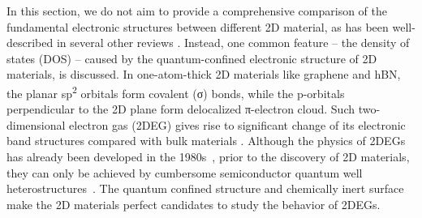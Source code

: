 %
In this section, we do not aim to provide a comprehensive comparison
of the fundamental electronic structures between different 2D
material, as has been well-described in several other reviews
\autocite{Neto_2009_Electron_gr_rev,Mas_Ballest_2011_review,Das_Sarma_2011_electron_gr,Butler_2013_review,Bhimanapati_2015_2D_rev,Novoselov_2016_vdW}.
%
Instead, one common feature -- the density of states (DOS) -- caused
by the quantum-confined electronic structure of 2D materials, is
discussed.
%
In
one-atom-thick 2D materials like graphene and hBN, the planar
sp\textsuperscript{2} orbitals form covalent (σ) bonds, while the
p-orbitals perpendicular to the 2D plane form delocalized π-electron
cloud\autocite{Ihn_2009_book}.
%
Such two-dimensional
electron gas (2DEG) gives rise to significant change of its electronic
band structures compared with bulk materials \autocite{Davies_1997_book}.
%
Although the physics of 2DEGs has already been developed in the
1980s~\autocite{Ando_1982_electron_2D}, prior to the discovery of 2D
materials, they can only be achieved by cumbersome semiconductor
quantum well
heterostructures~\autocite{Ihn_2009_book,Davies_1997_book}. The quantum
confined structure and chemically inert surface make the 2D materials
perfect candidates to study the behavior of 2DEGs.


